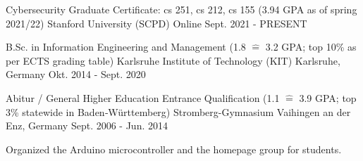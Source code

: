 

\begin{cventries}

  \cventry
    {Cybersecurity Graduate Certificate: cs 251, cs 212, cs 155 (3.94 GPA as of spring 2021/22)} %
    {Stanford University (SCPD)} %
    {Online} %
    {Sept. 2021 - PRESENT} %
    {}

  \cventry
    {B.Sc. in Information Engineering and Management (1.8 $\widehat{=}$ 3.2 GPA; top 10\% as per ECTS grading table)} %
    {Karlsruhe Institute of Technology (KIT) } %
    {Karlsruhe, Germany} %
    {Okt. 2014 - Sept. 2020} %
    {}
  
  \cventry
    {Abitur / General Higher Education Entrance Qualification  (1.1 $\widehat{=}$ 3.9 GPA; top 3\% statewide in Baden‑Württemberg)} %
    {Stromberg-Gymnasium} %
    {Vaihingen an der Enz, Germany} %
    {Sept. 2006 - Jun. 2014} %
    {
      \begin{cvitems} %
        \item {Organized the Arduino microcontroller and the homepage group for students.}
      \end{cvitems}
    }

\end{cventries}

